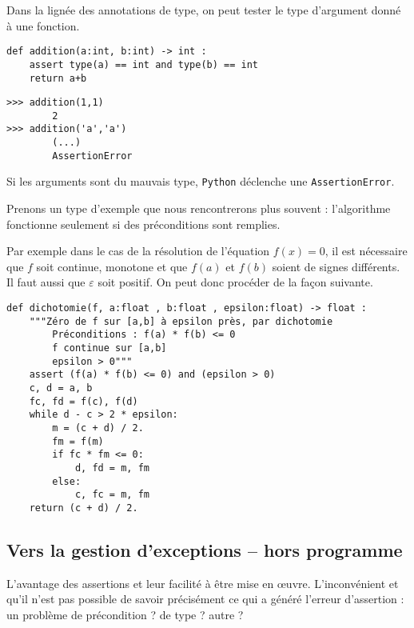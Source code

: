 \begin{exemple}
Dans la lignée des annotations de type, on peut tester le type d'argument donné à une fonction. 
\begin{minipage}[c]{.45\linewidth}
\begin{lstlisting}
def addition(a:int, b:int) -> int : 
    assert type(a) == int and type(b) == int
    return a+b
\end{lstlisting}
\end{minipage} \hfill
\begin{minipage}[c]{.45\linewidth}
\begin{lstlisting}
>>> addition(1,1)
        2
>>> addition('a','a')
        (...)
        AssertionError
\end{lstlisting}
\end{minipage} 

Si les arguments sont du mauvais type, \texttt{Python} déclenche une \texttt{AssertionError}.
\end{exemple}


\begin{exemple} Prenons un type d'exemple que nous rencontrerons plus souvent : l'algorithme fonctionne seulement si des préconditions sont remplies. 

Par exemple dans le cas de la résolution de l'équation $f(x)=0$, il est nécessaire que $f$ soit continue, monotone et que $f(a)$ et $f(b)$ soient de signes différents. Il faut aussi que $\varepsilon$ soit positif. On peut donc procéder de la façon suivante. 

\begin{lstlisting}
def dichotomie(f, a:float , b:float , epsilon:float) -> float :
    """Zéro de f sur [a,b] à epsilon près, par dichotomie
        Préconditions : f(a) * f(b) <= 0
        f continue sur [a,b]
        epsilon > 0"""
    assert (f(a) * f(b) <= 0) and (epsilon > 0)
    c, d = a, b
    fc, fd = f(c), f(d)
    while d - c > 2 * epsilon:
        m = (c + d) / 2.
        fm = f(m)
        if fc * fm <= 0:
            d, fd = m, fm
        else:
            c, fc = m, fm
    return (c + d) / 2.
\end{lstlisting}
\end{exemple}

\subsection{Vers la gestion d'exceptions -- hors programme}
L'avantage des assertions et leur facilité à être mise en \oe{}uvre. L'inconvénient et qu'il n'est pas possible de savoir précisément ce qui a généré l'erreur d'assertion : un problème de précondition ? de type ? autre ?

